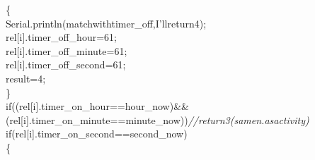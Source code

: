 \documentclass[a4paper, 12pt]{article}
\newcommand\SPC{\hspace*{0.6em}}
\newcommand\QOT{\mbox{\char 34}}
\newcommand{\CppAComment}[1]{\textit{\textcolor[rgb]{0.2,0.4,1}{#1}}}
\newcommand{\CppAIdentifier}[1]{\textcolor[rgb]{0,1,0}{#1}}
\newcommand{\CppANumber}[1]{\textcolor[rgb]{0,0,1}{#1}}
\newcommand{\CppAReservedWord}[1]{\textcolor[rgb]{0,0.5,0}{#1}}
\newcommand{\CppASpace}[1]{\textcolor[rgb]{1,1,1}{\colorbox[rgb]{0,0,0}{#1}}}
\newcommand{\CppAString}[1]{\textcolor[rgb]{0.76,0.76,0.76}{#1}}
\newcommand{\CppASymbol}[1]{\textcolor[rgb]{1,0,0}{#1}}
\begin{document}
\begin{ttfamily}
\CppASpace{\SPC \SPC \SPC \SPC \SPC \SPC \SPC \SPC }\CppASymbol{\{}\\
\CppASpace{\SPC \SPC \SPC \SPC \SPC \SPC \SPC \SPC }\CppAIdentifier{Serial}\CppASymbol{.}\CppAIdentifier{println}\CppASymbol{(}\CppAString{\QOT \SPC match\SPC with\SPC timer\_off,\SPC I'll\SPC return\SPC 4\QOT }\CppASymbol{)}\CppASymbol{;}\\
\CppASpace{\SPC \SPC \SPC \SPC \SPC \SPC \SPC \SPC }\CppAIdentifier{rel}\CppASymbol{[}\CppAIdentifier{i}\CppASymbol{]}\CppASymbol{.}\CppAIdentifier{timer\_off\_hour}\CppASpace{\SPC }\CppASymbol{=}\CppASpace{\SPC }\CppANumber{61}\CppASymbol{;}\\
\CppASpace{\SPC \SPC \SPC \SPC \SPC \SPC \SPC \SPC }\CppAIdentifier{rel}\CppASymbol{[}\CppAIdentifier{i}\CppASymbol{]}\CppASymbol{.}\CppAIdentifier{timer\_off\_minute}\CppASpace{\SPC }\CppASymbol{=}\CppASpace{\SPC }\CppANumber{61}\CppASymbol{;}\\
\CppASpace{\SPC \SPC \SPC \SPC \SPC \SPC \SPC \SPC }\CppAIdentifier{rel}\CppASymbol{[}\CppAIdentifier{i}\CppASymbol{]}\CppASymbol{.}\CppAIdentifier{timer\_off\_second}\CppASpace{\SPC }\CppASymbol{=}\CppASpace{\SPC }\CppANumber{61}\CppASymbol{;}\\
\CppASpace{\SPC \SPC \SPC \SPC \SPC \SPC \SPC \SPC }\CppAIdentifier{result}\CppASymbol{=}\CppANumber{4}\CppASymbol{;}\\
\CppASpace{\SPC \SPC \SPC \SPC \SPC \SPC \SPC \SPC }\CppASymbol{\}}\\
\CppASpace{\SPC \SPC \SPC \SPC }\CppAReservedWord{if}\CppASpace{\SPC }\CppASymbol{(}\CppASpace{\SPC }\CppASymbol{(}\CppAIdentifier{rel}\CppASymbol{[}\CppAIdentifier{i}\CppASymbol{]}\CppASymbol{.}\CppAIdentifier{timer\_on\_hour}\CppASymbol{==}\CppAIdentifier{hour\_now}\CppASpace{\SPC }\CppASymbol{)}\CppASpace{\SPC }\CppASymbol{\&\&}\CppASpace{\SPC }\CppASymbol{(}\CppAIdentifier{rel}\CppASymbol{[}\CppAIdentifier{i}\CppASymbol{]}\CppASymbol{.}\CppAIdentifier{timer\_on\_minute}\CppASymbol{==}\CppAIdentifier{minute\_now}\CppASymbol{)}\CppASpace{\SPC }\CppASymbol{)}\CppASpace{\SPC }\CppAComment{//return\SPC 3\SPC (same\SPC n.\SPC as\SPC activity)}\\
\CppASpace{\SPC \SPC \SPC \SPC \SPC \SPC \SPC \SPC }\CppAReservedWord{if}\CppASymbol{(}\CppASpace{\SPC }\CppAIdentifier{rel}\CppASymbol{[}\CppAIdentifier{i}\CppASymbol{]}\CppASymbol{.}\CppAIdentifier{timer\_on\_second}\CppASymbol{==}\CppAIdentifier{second\_now}\CppASpace{\SPC }\CppASymbol{)}\\
\CppASpace{\SPC \SPC \SPC \SPC \SPC \SPC \SPC \SPC }\CppASymbol{\{}\\

\end{ttfamily}
\end{document}
